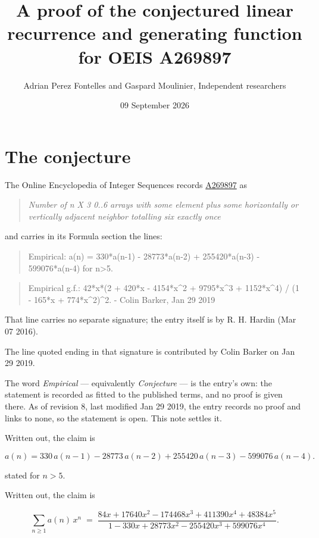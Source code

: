 \documentclass[11pt]{article}
\title{A proof of the conjectured linear recurrence and generating function for OEIS A269897}
\author{Adrian Perez Fontelles and Gaspard Moulinier, Independent researchers}
\date{09 September 2026}
\theoremstyle{definition}
\begin{document}
\maketitle
\section{The conjecture}

The Online Encyclopedia of Integer Sequences records \href{https://oeis.org/A269897}{A269897} as

\begin{quote}\itshape Number of n X 3 0..6 arrays with some element plus some horizontally or vertically adjacent neighbor totalling six exactly once\end{quote}

and carries in its Formula section the lines:

\begin{quote}\ttfamily Empirical: a(n) = 330*a(n-1) - 28773*a(n-2) + 255420*a(n-3) - 599076*a(n-4) for n>5.\end{quote}

\begin{quote}\ttfamily Empirical g.f.: 42*x*(2 + 420*x - 4154*x\textasciicircum{}2 + 9795*x\textasciicircum{}3 + 1152*x\textasciicircum{}4) / (1 - 165*x + 774*x\textasciicircum{}2)\textasciicircum{}2. - Colin Barker, Jan 29 2019\end{quote}

That line carries no separate signature; the entry itself is by R. H. Hardin (Mar 07 2016).

The line quoted ending in that signature is contributed by Colin Barker on Jan 29 2019.

The word {\itshape Empirical} --- equivalently {\itshape Conjecture} --- is the entry's own: the statement is recorded as fitted to the published terms, and no proof is given there. As of revision 8, last modified Jan 29 2019, the entry records no proof and links to none, so the statement is open. This note settles it.

Written out, the claim is

\[a(n) = 330\,a(n-1) - 28773\,a(n-2) + 255420\,a(n-3) - 599076\,a(n-4).\]

stated for $n > 5$.

Written out, the claim is

\[\sum_{n \ge 1} a(n)\,x^n \;=\; \frac{84x + 17640x^{2} - 174468x^{3} + 411390x^{4} + 48384x^{5}}{1 - 330x + 28773x^{2} - 255420x^{3} + 599076x^{4}}.\]
\end{document}

